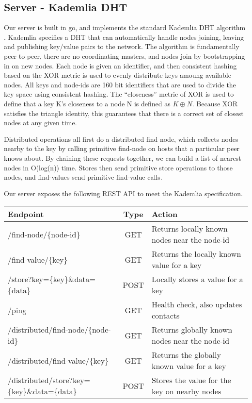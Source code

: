 \documentclass[a4paper,10pt]{article}
\begin{document}
\subsection{Server - Kademlia DHT}
Our server is built in go, and implements the standard Kademlia DHT 
algorithm \cite{kademlia}.  Kademlia specifies a DHT that can 
automatically handle nodes joining, leaving and publishing key/value pairs to 
the network.  The algorithm is fundamentally peer to peer, there are no 
coordinating masters, and nodes join by bootstrapping in on new nodes.  Each 
node is given an identifier, and then 
consistent hashing based on the XOR metric is used to evenly distribute keys 
amoung available nodes.  All keys and node-ids are 160 bit identifiers that are 
used to divide the key space using consistent hashing.  The ``closeness'' 
metric of XOR is used to define that a key K's closeness to a node N is defined 
as $K \oplus N$.  Because XOR satisfies the triangle identity, this guarantees 
that there is a correct set of closest nodes at any given time.

Distributed operations all first do a distributed find node, which collects 
nodes nearby to the key by calling primitive find-node on hosts that a 
particular peer knows about.  By chaining these requests together, we can build 
a list of nearest nodes in O(log(n)) time.  Stores then send primitive store 
operations to those nodes, and find-values send primitive find-value calls.

Our server exposes the following REST API to meet the Kademlia specification.  
\begin{center}
\begin{tabular}{| l | c | p{5cm} |}
\hline                       
\textbf{Endpoint} & \textbf{Type}& \textbf{Action}\\
\hline
/find-node/\{node-id\} & GET & Returns locally known nodes near the node-id\\
\hline
/find-value/\{key\} & GET & Returns the locally known value for a key\\
\hline
/store?key=\{key\}\&data=\{data\} & POST & Locally stores a value for a key\\
\hline
/ping & GET & Health check, also updates contacts\\
\hline
/distributed/find-node/\{node-id\} & GET & Returns globally known nodes near 
the node-id\\
\hline
/distributed/find-value/\{key\} & GET & Returns the globally known value for a 
key\\
\hline
/distributed/store?key=\{key\}\&data=\{data\} & POST & Stores the value for the
key on nearby nodes 

\end{tabular}
\end{center}
\end{document}
